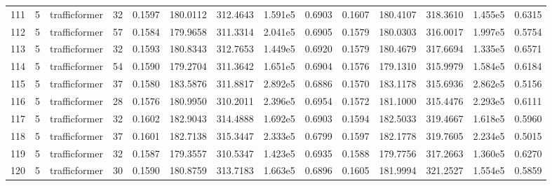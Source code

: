 \begin{landscape}
\begin{longtable}{c c c c c c c c c c c c c c}
	111 & 5 & trafficformer & 32 & 0.1597 & 180.0112 & 312.4643 & 1.591e5 & 0.6903 & 0.1607 & 180.4107 & 318.3610 & 1.455e5 & 0.6315 \\
	112 & 5 & trafficformer & 57 & 0.1584 & 179.9658 & 311.3314 & 2.041e5 & 0.6905 & 0.1579 & 180.0303 & 316.0017 & 1.997e5 & 0.5754 \\
	113 & 5 & trafficformer & 32 & 0.1593 & 180.8343 & 312.7653 & 1.449e5 & 0.6920 & 0.1579 & 180.4679 & 317.6694 & 1.335e5 & 0.6571 \\
	114 & 5 & trafficformer & 54 & 0.1590 & 179.2704 & 311.3642 & 1.651e5 & 0.6904 & 0.1576 & 179.1310 & 315.9979 & 1.584e5 & 0.6184 \\
	115 & 5 & trafficformer & 37 & 0.1580 & 183.5876 & 311.8817 & 2.892e5 & 0.6886 & 0.1570 & 183.1178 & 315.6936 & 2.862e5 & 0.5156 \\
	116 & 5 & trafficformer & 28 & 0.1576 & 180.9950 & 310.2011 & 2.396e5 & 0.6954 & 0.1572 & 181.1000 & 315.4476 & 2.293e5 & 0.6111 \\
	117 & 5 & trafficformer & 32 & 0.1602 & 182.9043 & 314.4888 & 1.692e5 & 0.6903 & 0.1594 & 182.5033 & 319.4667 & 1.618e5 & 0.5960 \\
	118 & 5 & trafficformer & 37 & 0.1601 & 182.7138 & 315.3447 & 2.333e5 & 0.6799 & 0.1597 & 182.1778 & 319.7605 & 2.234e5 & 0.5015 \\
	119 & 5 & trafficformer & 32 & 0.1587 & 179.3557 & 310.5347 & 1.423e5 & 0.6935 & 0.1588 & 179.7756 & 317.2663 & 1.360e5 & 0.6270 \\
	120 & 5 & trafficformer & 30 & 0.1590 & 180.8759 & 313.7183 & 1.663e5 & 0.6896 & 0.1605 & 181.9994 & 321.2527 & 1.554e5 & 0.5859 \\
\end{longtable}
	

\end{landscape}

